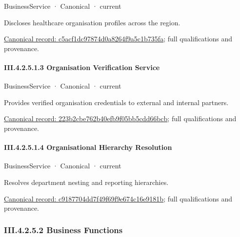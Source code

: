\label{element:c5acf1dc97874d0a8264f9a5c1b735fa}
{\small BusinessService · Canonical · current}\par

Discloses healthcare organisation profiles across the region.


{\footnotesize \href{../../../../continuum/business/business-service/c5acf1dc97874d0a8264f9a5c1b735fa.md}{Canonical record: c5acf1dc97874d0a8264f9a5c1b735fa}; full qualifications and provenance.}\par
\paragraph*{III.4.2.5.1.3 Organisation Verification Service}
\label{navigation:III.4.2.5.1.3}

\label{element:223b2cbe762b40efb9f05bb5cdd66bcb}
{\small BusinessService · Canonical · current}\par

Provides verified organisation credentials to external and internal partners.


{\footnotesize \href{../../../../continuum/business/business-service/223b2cbe762b40efb9f05bb5cdd66bcb.md}{Canonical record: 223b2cbe762b40efb9f05bb5cdd66bcb}; full qualifications and provenance.}\par
\paragraph*{III.4.2.5.1.4 Organisational Hierarchy Resolution}
\label{navigation:III.4.2.5.1.4}

\label{element:c9187704dd7f49f69f9e674c16e9181b}
{\small BusinessService · Canonical · current}\par

Resolves department nesting and reporting hierarchies.


{\footnotesize \href{../../../../continuum/business/business-service/c9187704dd7f49f69f9e674c16e9181b.md}{Canonical record: c9187704dd7f49f69f9e674c16e9181b}; full qualifications and provenance.}\par
\subsubsection*{III.4.2.5.2 Business Functions}
\label{navigation:III.4.2.5.2}

